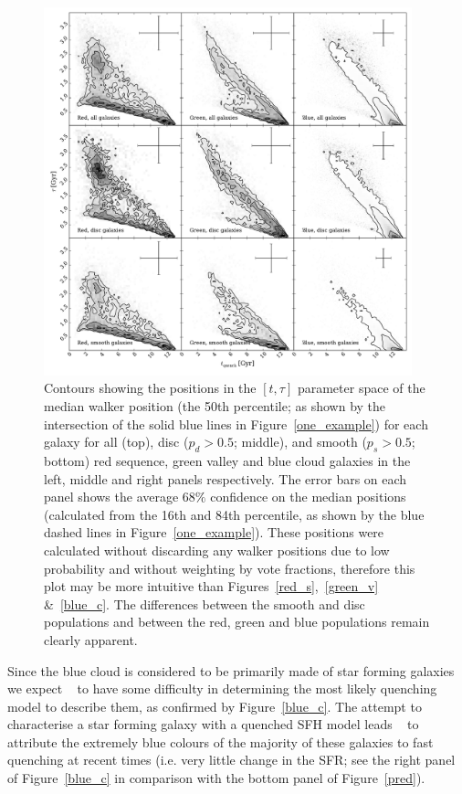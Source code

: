\begin{figure}\label{bestfit}
\includegraphics[width=0.95\textwidth]{morphology/contour_t_tau_mcmc_bestfit.pdf}
\caption[Best fit contours for red, green and blue clean galaxies]{Contours showing the positions in the $[t, \tau]$ parameter space of the median walker position (the 50th percentile; as shown by the intersection of the solid blue lines in Figure~\ref{one_example}) for each galaxy for all (top), disc ($p_d > 0.5$; middle), and smooth ($p_s > 0.5$; bottom) red sequence, green valley and blue cloud galaxies in the left, middle and right panels respectively. The error bars on each panel shows the average $68\%$ confidence on the median positions (calculated from the 16th and 84th percentile, as shown by the blue dashed lines in Figure~\ref{one_example}). These positions were calculated without discarding any walker positions due to low probability and without weighting by vote fractions, therefore this plot may be more intuitive than Figures~\ref{red_s},~\ref{green_v} \&~\ref{blue_c}. The differences between the smooth and disc populations and between the red, green and blue populations remain clearly apparent.}
\end{figure}

Since the blue cloud is considered to be primarily made of star forming galaxies we expect \starpy~ to have some difficulty in determining the most likely quenching model to describe them, as confirmed by Figure~\ref{blue_c}. The attempt to characterise a star forming galaxy with a quenched SFH model leads \starpy~ to attribute the extremely blue colours of the majority of these galaxies to fast quenching at recent times (i.e. very little change in the SFR; see the right panel of Figure~\ref{blue_c} in comparison with the bottom panel of Figure~\ref{pred}).

